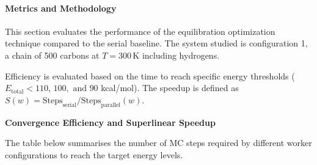 \documentclass[
]{article}
\begin{document}
\paragraph{Metrics and Methodology}\label{metrics-and-methodology}

This section evaluates the performance of the equilibration optimization
technique compared to the serial baseline. The system studied is
configuration 1, a chain of 500 carbons at \(T = 300\,\text{K}\)
including hydrogens.

Efficiency is evaluated based on the time to reach specific energy
thresholds (\(E_{\text{total}} < 110,\, 100,\text{ and } 90\) kcal/mol).
The speedup is defined as
\(S(w) = \text{Steps}_{\text{serial}} / \text{Steps}_{\text{parallel}}(w)\).

\textbf{Convergence Efficiency and Superlinear Speedup}

The table below summarises the number of MC steps required by different
worker configurations to reach the target energy levels.
\end{document}
